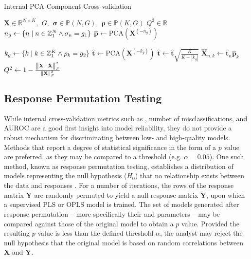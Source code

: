 \begin{algorithm}[H]
\caption{Internal PCA Component Cross-validation}
\label{algorithm.3.9}
\begin{algorithmic}[1]
\REQUIRE $\mathbf{X} \in \mathbb{R}^{N \times K}$, $\:G$,
       $\:\boldsymbol{\sigma} \in \mathbb{P}(N, G)$,%
       $\:\boldsymbol{\rho} \in \mathbb{P}(K, G)$
\ENSURE $Q^2 \in \mathbb{R}$
  \STATE $n_g \gets \{ n \mid n \in \mathbb{Z}_{1}^{N} \wedge \sigma_n = g_1 \}$
    \STATE $\hat{\mathbf{p}} \gets \mathrm{PCA}(\mathbf{X}^{(-n_g)})$ 

    \STATE $k_g \gets \{ k \mid k \in \mathbb{Z}_{1}^{K} \wedge \rho_k = g_2 \}$
    \STATE $\hat{\mathbf{t}} \gets \mathrm{PCA}(\mathbf{X}^{(-k_g)})$ 
    \STATE $\hat{\mathbf{t}} \gets \hat{\mathbf{t}}
            \sqrt{\tfrac{K}{K - |k_g|}}$
        \STATE $\hat{\mathbf{X}}_{n,k} \gets
                \hat{\mathbf{t}}_n \hat{\mathbf{p}}_k$
      \ENDFOR
    \ENDFOR
  \ENDFOR
\ENDFOR
\STATE $Q^2 \gets 1 - \frac{\left\| \mathbf{X} - \hat{\mathbf{X}} \right\|_F^2}
                           {\left\| \mathbf{X} \right\|_F^2}$
\end{algorithmic}
\end{algorithm}

\subsection{Response Permutation Testing}

\begin{doublespace}
While internal cross-validation metrics such as \qsq{}, number of
misclassifications, and AUROC \cite{westerhuis:metab2008a} are a good first
insight into model reliability, they do not provide a robust mechanism for
discriminating between low- and high-quality models. Methods that report a
degree of statistical significance in the form of a $p$ value are preferred,
as they may be compared to a threshold (e.g. $\alpha = 0.05$). One such method,
known as response permutation testing, establishes a distribution of models
representing the null hypothesis ($H_0$) that no relationship exists between
the data and responses \cite{westerhuis:metab2008a}. For a number of
iterations, the rows of the response matrix $\mathbf{Y}$ are randomly permuted
to yield a null response matrix $\tilde{\mathbf{Y}}$, upon which a supervised
PLS or OPLS model is trained. The set of models generated after response
permutation -- more specifically their \rsq{} and \qsq{} parameters -- may be
compared against those of the original model to obtain a $p$ value. Provided
the resulting $p$ value is less than the defined threshold $\alpha$, the
analyst may reject the null hypothesis that the original model is based on
random correlations between $\mathbf{X}$ and $\mathbf{Y}$.
\end{doublespace}

